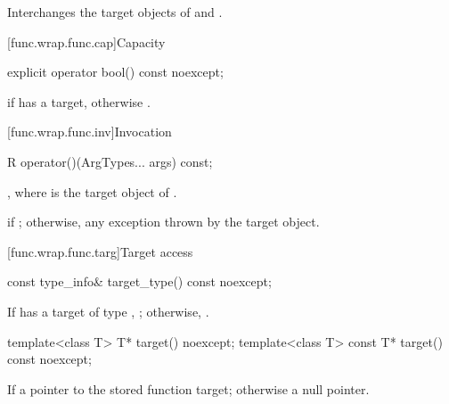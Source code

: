 \begin{itemdescr}
\pnum
\effects
Interchanges the target objects of  and .
\end{itemdescr}

[func.wrap.func.cap]{Capacity}

%
\begin{itemdecl}
explicit operator bool() const noexcept;
\end{itemdecl}

\begin{itemdescr}
\pnum
\returns
{} if  has a target, otherwise .
\end{itemdescr}

[func.wrap.func.inv]{Invocation}

%
%
\begin{itemdecl}
R operator()(ArgTypes... args) const;
\end{itemdecl}

\begin{itemdescr}
\pnum
\returns
{},
where  is the target object of .

\pnum
\throws
{} if ; otherwise, any
exception thrown by the target object.
\end{itemdescr}

[func.wrap.func.targ]{Target access}

%
\begin{itemdecl}
const type_info& target_type() const noexcept;
\end{itemdecl}

\begin{itemdescr}
\pnum
\returns
If  has a target of type ,
  ; otherwise, .
\end{itemdescr}

%
\begin{itemdecl}
template<class T>       T* target() noexcept;
template<class T> const T* target() const noexcept;
\end{itemdecl}

\begin{itemdescr}
\pnum
\returns
If 
a pointer to the stored function target; otherwise a null pointer.
\end{itemdescr}


